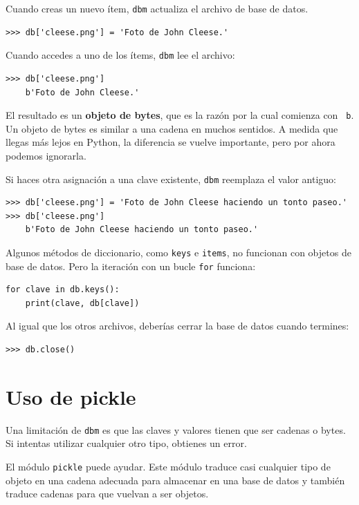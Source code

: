 \documentclass[10pt]{book}
\begin{document}
Cuando creas un nuevo ítem, {\tt dbm} actualiza el archivo de base de datos.

\begin{verbatim}
>>> db['cleese.png'] = 'Foto de John Cleese.'
\end{verbatim}
%
Cuando accedes a uno de los ítems, {\tt dbm} lee el archivo:

\begin{verbatim}
>>> db['cleese.png']
    b'Foto de John Cleese.'
\end{verbatim}
%
El resultado es un {\bf objeto de bytes}, que es la razón por la cual comienza con {\tt
  b}.  Un objeto de bytes es similar a una cadena en muchos sentidos.  A medida que llegas más lejos en Python, la diferencia se vuelve importante, pero por ahora
podemos ignorarla.

Si haces otra asignación a una clave existente, {\tt dbm} reemplaza
el valor antiguo:

\begin{verbatim}
>>> db['cleese.png'] = 'Foto de John Cleese haciendo un tonto paseo.'
>>> db['cleese.png']
    b'Foto de John Cleese haciendo un tonto paseo.'
\end{verbatim}
%

Algunos métodos de diccionario, como {\tt keys} e {\tt items}, no
funcionan con objetos de base de datos.  Pero la iteración con un bucle {\tt for}
funciona:

\begin{verbatim}
for clave in db.keys():
    print(clave, db[clave])
\end{verbatim}
%
Al igual que los otros archivos, deberías cerrar la base de datos cuando
termines:

\begin{verbatim}
>>> db.close()
\end{verbatim}
%


\section{Uso de pickle}

Una limitación de {\tt dbm} es que las claves y valores tienen que ser
cadenas o bytes.  Si intentas utilizar cualquier otro tipo, obtienes un error.
 

El módulo {\tt pickle} puede ayudar.  Este módulo traduce
casi cualquier tipo de objeto en una cadena adecuada para almacenar
en una base de datos y también traduce cadenas para que vuelvan a ser objetos.
\end{document}
